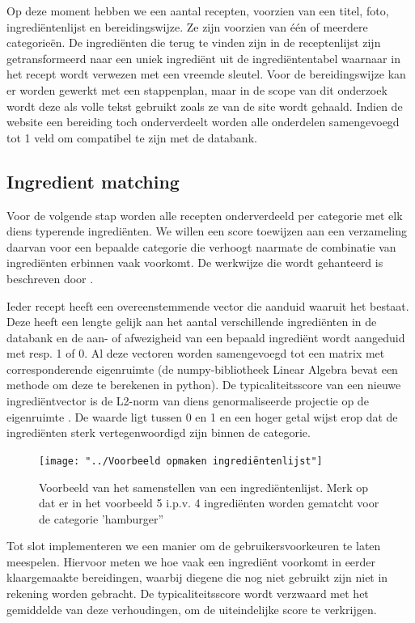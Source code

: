 \documentclass{hogent-article}
\begin{document}
Op deze moment hebben we een aantal recepten, voorzien van een titel, foto, ingrediëntenlijst en bereidingswijze. Ze zijn voorzien van één of meerdere categorieën. De ingrediënten die terug te vinden zijn in de receptenlijst zijn getransformeerd naar een uniek ingrediënt uit de ingrediëntentabel waarnaar in het recept wordt verwezen met een vreemde sleutel. Voor de bereidingswijze kan er worden gewerkt met een stappenplan, maar in de scope van dit onderzoek wordt deze als volle tekst gebruikt zoals ze van de site wordt gehaald. Indien de website een bereiding toch onderverdeelt worden alle onderdelen samengevoegd tot 1 veld om compatibel te zijn met de databank.

\subsection{Ingredient matching}%

Voor de volgende stap worden alle recepten onderverdeeld per categorie met elk diens typerende ingrediënten. We willen een score toewijzen aan een verzameling daarvan voor een bepaalde categorie die verhoogt naarmate de combinatie van ingrediënten erbinnen vaak voorkomt. De werkwijze die wordt gehanteerd is beschreven door \textcite{Yokoi2015}.

Ieder recept heeft een overeenstemmende vector die aanduid waaruit het bestaat. Deze heeft een lengte gelijk aan het aantal verschillende ingrediënten in de databank en de aan- of afwezigheid van een bepaald ingrediënt wordt aangeduid met resp. 1 of 0. Al deze vectoren worden samengevoegd tot een matrix met  corresponderende eigenruimte (de numpy-bibliotheek Linear Algebra bevat een methode om deze te berekenen in python). De typicaliteitsscore van een nieuwe ingrediëntvector  \autocite{Yokoi2015} is de L2-norm van diens genormaliseerde projectie op de eigenruimte \autocite{Karabiber}. De waarde ligt tussen 0 en 1 en een hoger getal wijst erop dat de ingrediënten sterk vertegenwoordigd zijn binnen de categorie.\begin{figure}
    \centering
    \texttt{[image: "../Voorbeeld opmaken ingrediëntenlijst"]}
    \caption[Voorbeeld van het samenstellen van een ingrediëntenlijst]{Voorbeeld van het samenstellen van een ingrediëntenlijst. Merk op dat er in het voorbeeld 5 i.p.v. 4 ingrediënten worden gematcht voor de categorie 'hamburger'' \autocite{Yokoi2015}}
    \label{fig:voorbeeld-opmaken-ingredientenlijst}
\end{figure}

Tot slot implementeren we een manier om de gebruikersvoorkeuren te laten meespelen. Hiervoor meten we hoe vaak een ingrediënt voorkomt in eerder klaargemaakte bereidingen, waarbij diegene die nog niet gebruikt zijn niet in rekening worden gebracht. De typicaliteitsscore wordt verzwaard met het gemiddelde van deze verhoudingen, om de uiteindelijke score te verkrijgen.
\end{document}
